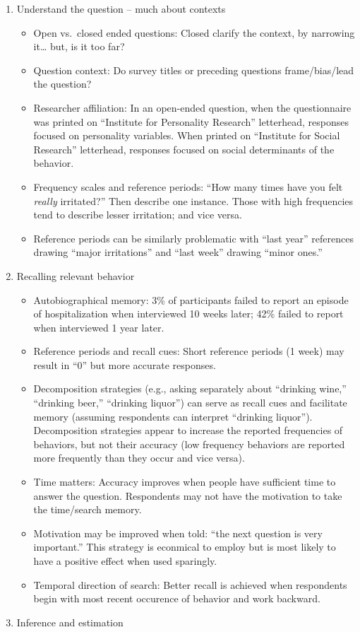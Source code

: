 \documentclass[
  english,
]{book}
\providecommand{\tightlist}{%
  \setlength{\itemsep}{0pt}\setlength{\parskip}{0pt}}
\begin{document}
\begin{enumerate}
\def\labelenumi{\arabic{enumi}.}
\tightlist
\item
  Understand the question -- much about contexts

  \begin{itemize}
  \tightlist
  \item
    Open vs.~closed ended questions: Closed clarify the context, by narrowing it\ldots{} but, is it too far?
  \item
    Question context: Do survey titles or preceding questions frame/bias/lead the question?
  \item
    Researcher affiliation: In an open-ended question, when the questionnaire was printed on ``Institute for Personality Research'' letterhead, responses focused on personality variables. When printed on ``Institute for Social Research'' letterhead, responses focused on social determinants of the behavior.
  \item
    Frequency scales and reference periods: ``How many times have you felt \emph{really} irritated?'' Then describe one instance. Those with high frequencies tend to describe lesser irritation; and vice versa.
  \item
    Reference periods can be similarly problematic with ``last year'' references drawing ``major irritations'' and ``last week'' drawing ``minor ones.''
  \end{itemize}
\item
  Recalling relevant behavior

  \begin{itemize}
  \tightlist
  \item
    Autobiographical memory: 3\% of participants failed to report an episode of hospitalization when interviewed 10 weeks later; 42\% failed to report when interviewed 1 year later.
  \item
    Reference periods and recall cues: Short reference periods (1 week) may result in ``0'' but more accurate responses.
  \item
    Decomposition strategies (e.g., asking separately about ``drinking wine,'' ``drinking beer,'' ``drinking liquor'') can serve as recall cues and facilitate memory (assuming respondents can interpret ``drinking liquor''). Decomposition strategies appear to increase the reported frequencies of behaviors, but not their accuracy (low frequency behaviors are reported more frequently than they occur and vice versa).
  \item
    Time matters: Accuracy improves when people have sufficient time to answer the question. Respondents may not have the motivation to take the time/search memory.
  \item
    Motivation may be improved when told: ``the next question is very important.'' This strategy is econmical to employ but is most likely to have a positive effect when used sparingly.
  \item
    Temporal direction of search: Better recall is achieved when respondents begin with most recent occurence of behavior and work backward.
  \end{itemize}
\item
  Inference and estimation


\end{enumerate}
\end{document}
